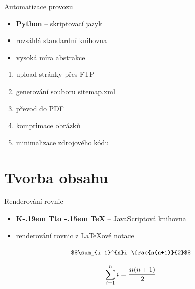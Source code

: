 \documentclass[14pt, hyperref={unicode}]{beamer}
\makeatletter
\newlength{\originalmarginlength}
\DeclareRobustCommand{\KaTeX}{%
  K\kern -.19em
  {\sbox \z@ T\vbox to\ht \z@ {\hbox{%
  \check@mathfonts
  \fontsize\sf@size\z@
  \selectfont A}%
  \vss}%
}\kern -.15em
\TeX}
\makeatother
\begin{document}
  \begin{frame}{Automatizace provozu}
    \begin{itemize}
      \item<+-> \textbf{Python} -- skriptovací jazyk
      \item<+-> rozsáhlá standardní knihovna
      \item<+-> vysoká míra abstrakce
    \end{itemize}

    \setlength\leftmargini{\originalmarginlength}

    \begin{enumerate}[<+- | alert@+>]
      \item upload stránky přes FTP
      \item generování souboru sitemap.xml
      \item převod do PDF
      \item komprimace obrázků
      \item minimalizace zdrojového kódu
    \end{enumerate}

    \setlength\leftmargini{0em}
  \end{frame}

  \section{Tvorba obsahu}

  \begin{frame}[fragile]{Renderování rovnic}
    \begin{itemize}
      \item<+-> {\mathfont\textbf{\KaTeX}} -- JavaScriptová knihovna
      \item<+-> renderování rovnic z {\mathfont\LaTeX}ové notace
    \end{itemize}
    
    \onslide<+->
    \begin{equation}
      \small
      \verb|$$\sum_{i=1}^{n}i=\frac{n(n+1)}{2}$$|
    \end{equation}

    \onslide<+->
    \begin{equation}
      \small
      \sum_{i=1}^{n} i = \frac{n(n+1)}{2}
    \end{equation}
  \end{frame}
\end{document}
